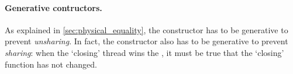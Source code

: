 \paragraph{Generative contructors.}
As explained in \cref{sec:physical_equality}, the  constructor has to be generative to prevent \emph{unsharing}.
In fact, the  constructor also has to be generative to prevent \emph{sharing}: when the `closing' thread wins the , it must be true that the `closing' function has not changed.
